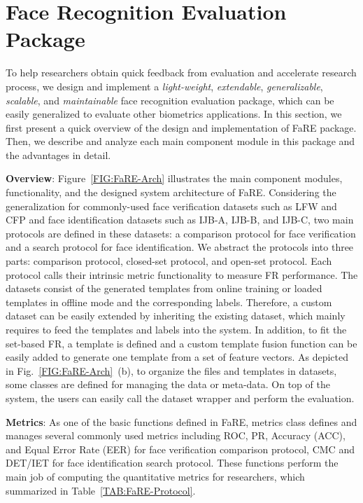 \documentclass{article}
\newcommand{\fare}{FaRE}
\begin{document}
\section{Face Recognition Evaluation Package}
\label{SEC:FaRE-Method}
To help researchers obtain quick feedback from evaluation and accelerate research process, we design and implement a \textit{light-weight}, \textit{extendable}, \textit{generalizable}, \textit{scalable}, and \textit{maintainable} face recognition evaluation package, which can be easily generalized to evaluate other biometrics applications.
In this section, we first present a quick overview of the design and implementation of FaRE package.
Then, we describe and analyze each main component module in this package and the advantages in detail.

\noindent \textbf{Overview}:
Figure~\ref{FIG:FaRE-Arch} illustrates the main component modules, functionality, and the designed system architecture of FaRE.
Considering the generalization for commonly-used face verification datasets such as LFW and CFP and face identification datasets such as IJB-A, IJB-B, and IJB-C, two main protocols are defined in these datasets: a comparison protocol for face verification and a search protocol for face identification.
We abstract the protocols into three parts: comparison protocol, closed-set protocol, and open-set protocol.
Each protocol calls their intrinsic metric functionality to measure FR performance.
The datasets consist of the generated templates from online training or loaded templates in offline mode and the corresponding labels.
Therefore, a custom dataset can be easily extended by inheriting the existing dataset, which mainly requires to feed the templates and labels into the system.
In addition, to fit the set-based FR, a template is defined and a custom template fusion function can be easily added to generate one template from a set of feature vectors.
As depicted in Fig.~\ref{FIG:FaRE-Arch}~(b), to organize the files and templates in datasets, some classes are defined for managing the data or meta-data.
On top of the system, the users can easily call the dataset wrapper and perform the evaluation.

\noindent \textbf{Metrics}:
As one of the basic functions defined in \fare, metrics class defines and manages several commonly used metrics including ROC, PR, Accuracy (ACC), and Equal Error Rate (EER) for face verification comparison protocol, CMC and DET/IET for face identification search protocol.
These functions perform the main job of computing the quantitative metrics for researchers, which summarized in Table~\ref{TAB:FaRE-Protocol}.
\end{document}
